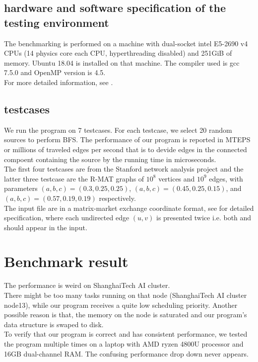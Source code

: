 \documentclass{article}
\newcommand{\reportSection}[1]{
   \section{#1}
   \rhead{section \emph{#1}}
}
\begin{document}
\subsection{hardware and software specification of the testing environment}

The benchmarking is performed on a machine with dual-socket intel E5-2690 v4 CPUs (14 physics core each CPU, hyperthreading disabled) and 251GiB of memory.
Ubuntu 18.04 is installed on that machine.  The compiler used is gcc 7.5.0 and OpenMP version is 4.5.\\
For more detailed information, see .

\subsection{testcases}

We run the program on 7 testcases.
For each testcase, we select 20 random sources to perform BFS.
The performance of our program is reported in MTEPS or millions of traveled edges per second that is to devide edges in the connected compoent containing the source by the running time in microseconds.\\

The first four testcases are from the Stanford network analysis project \cite{snapnets}
and the latter three testcase are the R-MAT \cite{khorasani2015parmat} graphs of $10^8$ vertices and $10^9$ edges, with parameters $(a,b,c)=(0.3,0.25,0.25)$, $(a,b,c)=(0.45,0.25,0.15)$, and $(a,b,c)=(0.57,0.19,0.19)$ respectively.\\

The input file are in a matrix-market exchange coordinate format, see \cite{matrixmarket} for detailed specification, where each undirected edge $(u,v)$ is presented twice i.e. both  and  should appear in the input.

\reportSection{Benchmark result}

The performance is weird on ShanghaiTech AI cluster.\\
There might be too many tasks running on that node (ShanghaiTech AI cluster node13), while our program receives a quite low scheduling priority.
Another possible reason is that, the memory on the node is saturated and our program's data structure is swaped to disk.\\
To verify that our program is correct and has consistent performance, we tested the program multiple times on a laptop with AMD ryzen 4800U processor and 16GB dual-channel RAM. The confusing performance drop down never appears.\\
\end{document}
